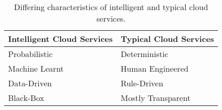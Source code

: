 \begin{table}[p]
\centering
\caption[Differing characteristics of cloud services]{Differing characteristics of intelligent and typical cloud services.}
\label{tab:introduction:characteristics-of-cloud}
\begin{tabular}{@{}ll@{}}
\toprule
  \textbf{Intelligent Cloud Services} &
  \textbf{Typical Cloud Services}
  \\
  \midrule
  Probabilistic &
  Deterministic 
  \\
  Machine Learnt &
  Human Engineered
  \\
  Data-Driven &
  Rule-Driven
  \\
  Black-Box &
  Mostly Transparent
  \\
  \bottomrule
\end{tabular}
\end{table}